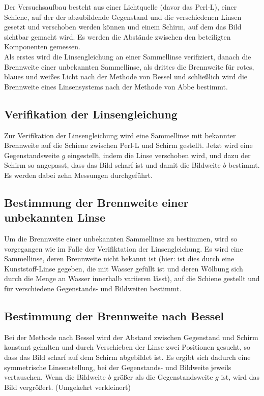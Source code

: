 Der Versuchsaufbau besteht aus einer Lichtquelle (davor das Perl-L), einer Schiene, auf der der abzubildende Gegenstand und die verschiedenen Linsen gesetzt und verschoben werden können und einem Schirm, auf dem das Bild sichtbar gemacht wird. Es werden die Abstände zwischen den beteiligten Komponenten gemessen.\\

Als erstes wird die Linsengleichung an einer Sammellinse
verifiziert, danach die Brennweite einer unbekannten Sammellinse, als drittes die Brennweite für rotes, blaues und weißes Licht
nach der Methode von Bessel und schließlich wird die Brennweite eines Linsensystems nach der Methode von Abbe bestimmt.

\subsection{Verifikation der Linsengleichung}

Zur Verifikation der Linsengleichung wird eine Sammellinse mit bekannter Brennweite auf die Schiene zwischen Perl-L und Schirm gestellt. Jetzt wird
eine Gegenstandsweite $g$ eingestellt, indem die Linse verschoben wird,
und dazu der Schirm so angepasst, dass das Bild scharf ist und damit die Bildweite $b$ bestimmt. Es werden dabei zehn Messungen durchgeführt.

\subsection{Bestimmung der Brennweite einer unbekannten Linse}

Um die Brennweite einer unbekannten Sammellinse zu bestimmen, wird so
vorgegangen wie im Falle der Verifiktation der Linsengleichung. Es wird
eine Sammellinse, deren Brennweite nicht bekannt ist (hier: ist dies durch eine Kunststoff-Linse gegeben, die mit Wasser gefüllt ist
und deren Wölbung sich durch die Menge an Wasser innerhalb variieren
lässt), auf die Schiene gestellt und für verschiedene Gegenstands- und Bildweiten bestimmt.

\subsection{Bestimmung der Brennweite nach Bessel}

Bei der Methode nach Bessel wird der Abstand zwischen Gegenstand und Schirm
konstant gehalten und durch Verschieben der Linse zwei Positionen
gesucht, so dass das Bild scharf auf dem Schirm abgebildet ist. Es ergibt
sich dadurch eine symmetrische Linsenstellung, bei der Gegenstands- und
Bildweite jeweils vertauschen. Wenn die Bildweite $b$ größer als
die Gegenstandsweite $g$ ist, wird das Bild vergrößert. (Umgekehrt verkleinert)\\

